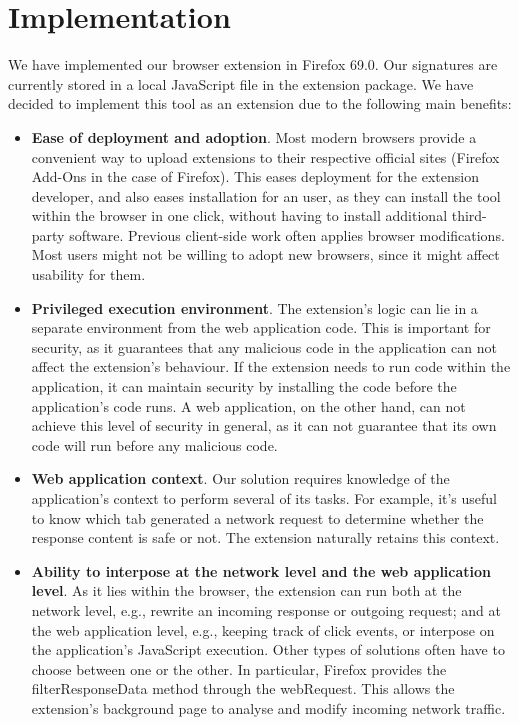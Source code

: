 \section{Implementation} \label{implementation}

We have implemented our browser extension in Firefox 69.0. Our signatures are currently stored in a local JavaScript file in the extension package. We have decided to implement this tool as an extension due to the following main benefits:
\begin{itemize}
	\item \textbf{Ease of deployment and adoption}. Most modern browsers provide a convenient way to upload extensions to their respective official sites (Firefox Add-Ons in the case of Firefox). This eases deployment for the extension developer, and also eases installation for an user, as they can install the tool within the browser in one click, without having to install additional third-party software. Previous client-side work often applies browser modifications. Most users might not be willing to adopt new browsers, since it might affect usability for them.
	\item \textbf{Privileged execution environment}. The extension's logic can lie in a separate environment from the web application code. This is important for security, as it guarantees that any malicious code in the application can not affect the extension's behaviour. If the extension needs to run code within the application, it can maintain security by installing the code before the application's code runs. A web application, on the other hand, can not achieve this level of security in general, as it can not guarantee that its own code will run before any malicious code.
	\item \textbf{Web application context}. Our solution requires knowledge of the application's context to perform several of its tasks. For example, it's useful to know which tab generated a network request to determine whether the response content is safe or not. The extension naturally retains this context.
	\item \textbf{Ability to interpose at the network level and the web application level}. As it lies within the browser, the extension can run both at the network level, e.g., rewrite an incoming response or outgoing request; and at the web application level, e.g., keeping track of click events, or interpose on the application's JavaScript execution. Other types of solutions often have to choose between one or the other. In particular, Firefox provides the filterResponseData method through the webRequest. This allows the extension's background page to analyse and modify incoming network traffic.
\end{itemize}

